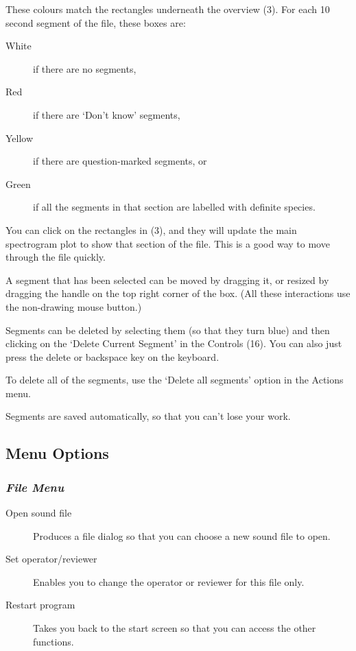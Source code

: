 \documentclass{article}
\begin{document}
These colours match the rectangles underneath the overview (3). For each 10 second segment of the file, these boxes are:
	\begin{description} 
 	\item[White] if there are no segments, 
	\item[Red] if there are `Don't know' segments, 
	\item[Yellow] if there are question-marked segments, or 
	\item[Green] if all the segments in that section are labelled with definite species. 
	\end{description}
	
You can click on the rectangles in (3), and they will update the main spectrogram plot to show that section of the file. This is a good way to move through the file quickly.

A segment that has been selected can be moved by dragging it, or resized by dragging the handle on the top right corner of the box. (All these interactions use the non-drawing mouse button.)

Segments can be deleted by selecting them (so that they turn blue) and then clicking on the `Delete Current Segment' in the Controls (16). You can also just press the delete or backspace key on the keyboard. 

To delete all of the segments, use the `Delete all segments' option in the Actions menu. 

Segments are saved automatically, so that you can't lose your work.


\subsection{Menu Options}	

\subsubsection{{\em File Menu}}

\begin{description}
\item[Open sound file] Produces a file dialog so that you can choose a new sound file to open.
\item[Set operator/reviewer] Enables you to change the operator or reviewer for this file only. 
\item[Restart program] Takes you back to the start screen so that you can access the other functions.
\end{description}
\end{document}
